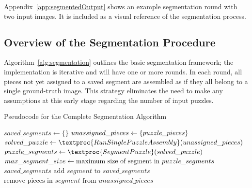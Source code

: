 Appendix~\ref{app:segmentedOutput} shows an example segmentation round with two input images. It is included as a visual reference of the segmentation process.

\subsection{Overview of the Segmentation Procedure}

Algorithm~\ref{alg:segmentation} outlines the basic segmentation framework; the implementation is iterative and will have one or more rounds.  In each round, all pieces not yet assigned to a saved segment are assembled as if they all belong to a single ground-truth image.  This strategy eliminates the need to make any assumptions at this early stage regarding the number of input puzzles. 

\begin{algorithm}[t]
    \caption{Pseudocode for the Complete Segmentation Algorithm}\label{alg:segmentation}
    \begin{algorithmic}[1]
        \State $saved\_segments \gets \{ \}$
        \State $unassigned\_pieces \gets \{ puzzle\hspace{-0.8pt}\_pieces \}$
        \Loop
            \State $solved\_puzzle \gets \textproc{RunSinglePuzzleAssembly}(unassigned\_pieces)$
            \State $puzzle\hspace{-0.8pt}\_segments \gets \textproc{SegmentPuzzle}(solved\_puzzle)$
            \State $max\_segment\_size \gets \text{maximum size of segment in } puzzle\hspace{-0.8pt}\_segments$
                \State \Return $saved\_segments$
            \EndIf
                    \State $\text{add } segment \text{ to } saved\_segments$
                    \State $\text{remove pieces in } segment \text{ from } unassigned\_pieces$
                \EndIf
            \EndFor
        \EndLoop
        \EndFunction
    \end{algorithmic}
\end{algorithm}

